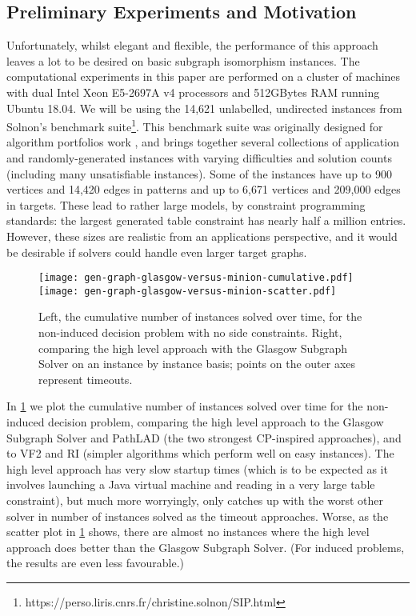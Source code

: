\documentclass[runningheads]{llncs}
\begin{document}
\subsection{Preliminary Experiments and Motivation}

Unfortunately, whilst elegant and flexible, the performance of this approach leaves a lot to be
desired on basic subgraph isomorphism instances.  The computational experiments in this paper are
performed on a cluster of machines with dual Intel Xeon E5-2697A v4 processors and 512GBytes RAM
running Ubuntu 18.04.  We will be using the 14,621 unlabelled, undirected instances from
Solnon's benchmark suite\footnote{https://perso.liris.cnrs.fr/christine.solnon/SIP.html}. This
benchmark suite was originally designed for algorithm portfolios work
\cite{DBLP:conf/lion/KotthoffMS16}, and brings together several collections of application and
randomly-generated instances with varying difficulties and solution counts (including many
unsatisfiable instances). Some of the instances have up to 900 vertices and 14,420 edges in patterns
and up to 6,671 vertices and 209,000 edges in targets. These lead to rather large models, by
constraint programming standards: the largest generated table constraint has nearly half a million
entries. However, these sizes are realistic from an applications perspective, and it would be
desirable if solvers could handle even larger target graphs.

\begin{figure}[tb]
\texttt{[image: gen-graph-glasgow-versus-minion-cumulative.pdf]}\hfill\texttt{[image: gen-graph-glasgow-versus-minion-scatter.pdf]}

    \caption{Left, the cumulative number of instances solved over time, for the non-induced decision
    problem with no side constraints. Right, comparing the high level approach with the Glasgow
    Subgraph Solver on an instance by instance basis; points on the outer axes represent
    timeouts.}\label{figure:solvers}
\end{figure}

In \cref{figure:solvers} we plot the cumulative number of instances solved over time for the
non-induced decision problem, comparing the high level approach to the Glasgow Subgraph Solver
\cite{DBLP:conf/gg/McCreeshP020} and PathLAD \cite{DBLP:conf/lion/KotthoffMS16} (the two strongest
CP-inspired approaches), and to VF2 \cite{DBLP:journals/pami/CordellaFSV04} and RI
\cite{DBLP:journals/bmcbi/BonniciGPSF13} (simpler algorithms which perform well on easy instances).
The high level approach has very slow startup times (which is to be expected as it involves
launching a Java virtual machine and reading in a very large table constraint), but much more
worryingly, only catches up with the worst other solver in number of instances solved as the timeout
approaches. Worse, as the scatter plot in \cref{figure:solvers} shows, there are almost no instances
where the high level approach does better than the Glasgow Subgraph Solver. (For induced problems,
the results are even less favourable.)
\end{document}
